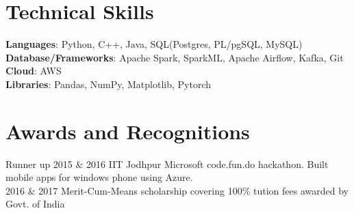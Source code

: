 \documentclass[letterpaper,11pt]{article}
\begin{document}
%
\section{Technical Skills}
\begin{itemize}[leftmargin=0.15in, label={}]
  \small{\item{
                \textbf{Languages}{: Python, C++, Java, SQL(Postgres, PL/pgSQL, MySQL)} \\
                \textbf{Database/Frameworks}{: Apache Spark, SparkML, Apache Airflow, Kafka, Git} \\
                \textbf{Cloud}{: AWS} \\
                \textbf{Libraries}{: Pandas, NumPy, Matplotlib, Pytorch}
          }}
\end{itemize}

%
\section{Awards and Recognitions }
\begin{itemize}[leftmargin=0.15in, label={}]
  \small{\item{
  {Runner up 2015 \& 2016 IIT Jodhpur Microsoft code.fun.do hackathon. Built mobile apps for windows phone using Azure. } \\
  {2016 \& 2017 Merit-Cum-Means scholarship covering 100\% tution fees awarded by Govt. of India}

  }}
\end{itemize}




\end{document}
